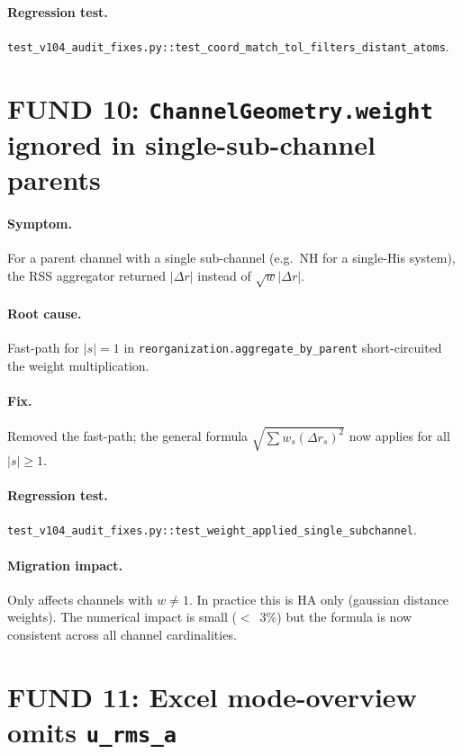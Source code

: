 \documentclass[10pt,a4paper,twoside]{article}
\newcommand{\fn}[1]{\texttt{#1}}
\begin{document}
\paragraph{Regression test.}
\fn{test\_v104\_audit\_fixes.py::test\_coord\_match\_tol\_filters\_distant\_atoms}.

\section{FUND 10: \fn{ChannelGeometry.weight} ignored in
                 single-sub-channel parents}
\label{sec:fund-10}

\paragraph{Symptom.}
For a parent channel with a single sub-channel (e.g.\ NH for a
single-His system), the RSS aggregator returned $|\Delta r|$
instead of $\sqrt{w}|\Delta r|$.

\paragraph{Root cause.}
Fast-path for $|s| = 1$ in
\fn{reorganization.aggregate\_by\_parent} short-circuited the
weight multiplication.

\paragraph{Fix.}
Removed the fast-path; the general formula
$\sqrt{\sum w_s (\Delta r_s)^2}$ now applies for all
$|s| \geq 1$.

\paragraph{Regression test.}
\fn{test\_v104\_audit\_fixes.py::test\_weight\_applied\_single\_subchannel}.

\paragraph{Migration impact.}
Only affects channels with $w \neq 1$. In practice this is HA only
(gaussian distance weights). The numerical impact is small
(\mbox{$<$}~3\%) but the formula is now consistent across all
channel cardinalities.

\section{FUND 11: Excel mode-overview omits \texttt{u\_rms\_a}}
\label{sec:fund-11}
\end{document}
